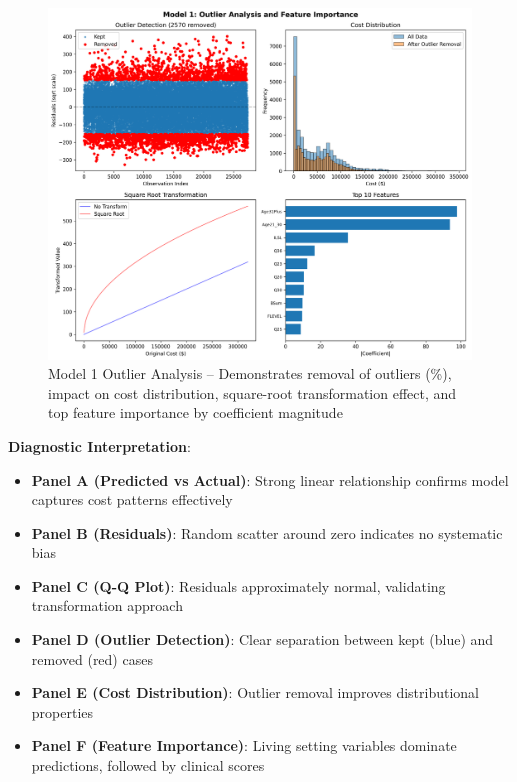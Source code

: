 \begin{figure}[h!]
\centering
\includegraphics[width=\textwidth]{models/model_1/model1_specific_diagnostics.png}
\caption{Model 1 Outlier Analysis -- Demonstrates removal of \ModelOneOutliersRemoved{} outliers (\ModelOneOutlierPercentage{}\%), impact on cost distribution, square-root transformation effect, and top feature importance by coefficient magnitude}
\label{fig:model1_specific}
\end{figure}

\textbf{Diagnostic Interpretation}:
\begin{itemize}
    \item \textbf{Panel A (Predicted vs Actual)}: Strong linear relationship confirms model captures cost patterns effectively
    \item \textbf{Panel B (Residuals)}: Random scatter around zero indicates no systematic bias
    \item \textbf{Panel C (Q-Q Plot)}: Residuals approximately normal, validating transformation approach
    \item \textbf{Panel D (Outlier Detection)}: Clear separation between kept (blue) and removed (red) cases
    \item \textbf{Panel E (Cost Distribution)}: Outlier removal improves distributional properties
    \item \textbf{Panel F (Feature Importance)}: Living setting variables dominate predictions, followed by clinical scores
\end{itemize}

